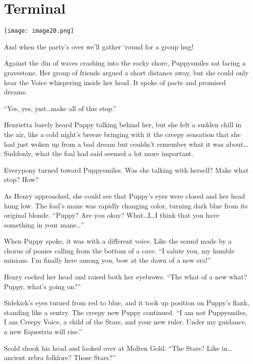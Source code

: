 \chapter{Terminal}

\texttt{[image: image20.png]}

\begin{intro}
    And when the party's over we'll gather `round for a group hug!
\end{intro}


Against the din of waves crashing into the rocky shore, Puppysmiles sat facing a gravestone. Her group of friends argued a short distance away, but she could only hear the Voice whispering inside her head. It spoke of pacts and promised dreams.

``Yes, yes, just\dots make all of this stop.''

Henrietta barely heard Puppy talking behind her, but she felt a sudden chill in the air, like a cold night's breeze bringing with it the creepy sensation that she had just woken up from a bad dream but couldn't remember what it was about\dots Suddenly, what the foal had said seemed a lot more important.

Everypony turned toward Puppysmiles. Was she talking with herself? Make what stop? How?

As Henry approached, she could see that Puppy's eyes were closed and her head hung low. The foal's mane was rapidly changing color, turning dark blue from its original blonde. ``Puppy? Are you okay? What\dots I\dots I think that you have something in your mane\dots''

When Puppy spoke, it was with a different voice. Like the sound made by a chorus of ponies calling from the bottom of a cave. ``I salute you, my humble minions. I'm finally here among you, bow at the dawn of a new era!''

Henry cocked her head and raised both her eyebrows. ``The what of a new what? Puppy, what's going on?''

Sidekick's eyes turned from red to blue, and it took up position on Puppy's flank, standing like a sentry. The creepy new Puppy continued. ``I am not Puppysmiles, I am Creepy Voice, a child of the Stars, and your new ruler. Under my guidance, a new Equestria will rise.''

Scold shook his head and looked over at Molten Gold. ``The Stars? Like in\dots ancient zebra folklore? Those Stars?''

